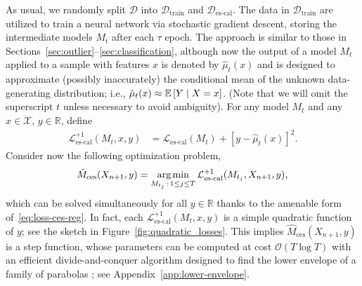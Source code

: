 As usual, we randomly split $\mathcal{D}$ into $\mathcal{D}_{\text{train}}$ and $\mathcal{D}_{\text{es-cal}}$.
The data in $\mathcal{D}_{\text{train}}$ are utilized to train a neural network via stochastic gradient descent, storing the intermediate models $M_t$ after each $\tau$ epoch.
The approach is similar to those in Sections~\ref{sec:outlier}--\ref{sec:classification}, although now the output of a model $M_t$ applied to a sample with features $x$ is denoted by $\hat{\mu}_t(x)$ and is designed to approximate (possibly inaccurately) the conditional mean of the unknown data-generating distribution; i.e., $\hat{\mu}_t(x) \approx \mathbb{E}\left[Y \mid X=x\right]$. (Note that we will omit the superscript $t$ unless necessary to avoid ambiguity).
For any model $M_t$ and any $x \in \mathcal{X}$, $y \in \mathbb{R}$, define
\begin{align} \label{eq:loss-ces-reg}
  \mathcal{L}_{\text{es-cal}}^{+1}(M_t,x,y)
  & = \mathcal{L}_{\text{es-cal}}(M_t) + [y-\hat{\mu}_t(x)]^2.
\end{align}
Consider now the following optimization problem,
\begin{align} \label{eq:ces-model-reg}
  \hat{M}_{\text{ces}}(X_{n+1},y) = \operatorname*{arg\,min}_{M_{t_j} \, : \, 1 \leq j \leq T} \mathcal{L}_{\text{es-cal}}^{+1}(M_{t_j},X_{n+1},y),
\end{align}
which can be solved simultaneously for all $y \in \mathbb{R}$ thanks to the amenable form of~\eqref{eq:loss-ces-reg}. In fact, each $\mathcal{L}_{\text{es-cal}}^{+1}(M_t,x,y)$ is a simple quadratic function of $y$; see the sketch in Figure~\ref{fig:quadratic_losses}.
This implies $\hat{M}_{\text{ces}}(X_{n+1},y)$ is a step function, whose parameters can be computed at cost $\mathcal{O}(T \log T)$ with an efficient divide-and-conquer algorithm designed to find the lower envelope of a family of parabolas \citep{devillers1995incremental,nielsen1998output}; see Appendix~\ref{app:lower-envelope}.


